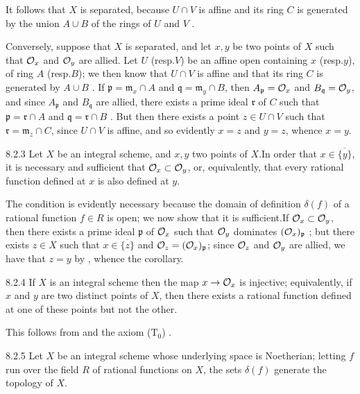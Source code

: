 It follows that $X$ is separated, because $U\cap V$ is affine and its ring $C$
is generated by the union $A\cup B$ of the rings of $U$ and $V$ .

Conversely, suppose that $X$ is separated, and let $x,y$ be two points of $X$
such that $\mathcal{O}_x$ and $\mathcal{O}_y$ are allied. Let $U$ (resp.$V$) be an affine open
containing $x$ (resp.$y$), of ring $A$ (resp.$B$); we then know that $U\cap V$
is affine and that its ring $C$ is generated by $A\cup B$ . If
$\mathfrak{p}=\mathfrak{m}_x\cap A$ and $\mathfrak{q}=\mathfrak{m}_y\cap B$,
then $A_\mathfrak{p}=\mathcal{O}_x$ and $B_\mathfrak{q}=\mathcal{O}_y$, and since $A_\mathfrak{p}$
and $B_\mathfrak{q}$ are allied, there exists a prime ideal $\mathfrak{r}$ of
$C$ such that $\mathfrak{p}=\mathfrak{r}\cap A$ and
$\mathfrak{q}=\mathfrak{r}\cap B$ . But then there exists a point
$z\in U\cap V$ such that $\mathfrak{r}=\mathfrak{m}_z\cap C$, since $U\cap V$ is
affine, and so evidently $x=z$ and $y=z$, whence $x=y$.

\begin{env}[Corollary]{8.2.3}
\label{cor-1.8.2.3}
Let $X$ be an integral scheme, and $x,y$ two
points of $X$.In order that $x\in\overline{\{y\}}$, it is necessary and
sufficient that $\mathcal{O}_x\subset\mathcal{O}_y$, or, equivalently, that every rational
function defined at $x$ is also defined at $y$.
\end{env}    

The condition is evidently necessary because the domain of definition
$\delta(f)$ of a rational function $f\in R$ is open; we now show that it is
sufficient.If $\mathcal{O}_x\subset\mathcal{O}_y$, then there exists a prime ideal
$\mathfrak{p}$ of $\mathcal{O}_x$ such that $\mathcal{O}_y$ dominates $(\mathcal{O}_x)_\mathfrak{p}$
; but  there exists $z\in X$ such that
$x\in\overline{\{z\}}$ and $\mathcal{O}_z=(\mathcal{O}_x)_\mathfrak{p}$; since $\mathcal{O}_z$ and $\mathcal{O}_y$
are allied, we have that $z=y$ by , whence the corollary.

\begin{env}[Corollary]{8.2.4}
\label{cor-1.8.2.4}
If $X$ is an integral scheme then the map
$x\to\mathcal{O}_x$ is injective; equivalently, if $x$ and $y$ are two distinct points of
$X$, then there exists a rational function defined at one of these points but
not the other.
\end{env}

This follows from  and the axiom ($\mathrm{T}_0$)
.

\begin{env}[Corollary]{8.2.5}
\label{cor-1.8.2.5}
Let $X$ be an integral scheme whose underlying
space is Noetherian; letting $f$ run over the field $R$ of rational functions on
$X$, the sets $\delta(f)$ generate the topology of $X$.
\end{env}

